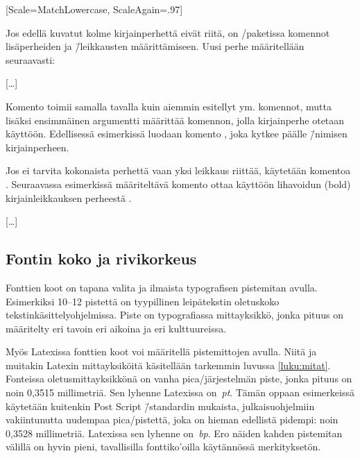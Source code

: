 \begin{koodilohkosis}
  \setmonofont{TeX Gyre Cursor}
  [Scale=MatchLowercase, ScaleAgain=.97]
\end{koodilohkosis}

\pagebreak[3]

Jos edellä kuvatut kolme kirjainperhettä eivät riitä, on
\-/paketissa komennot lisäperheiden ja \=/leikkausten
määrittämiseen. Uusi perhe määritellään seuraavasti:

\begin{koodilohkosis}
  […]
\end{koodilohkosis}

Komento  toimii samalla tavalla kuin
aiemmin esitellyt  ym. komennot, mutta
lisäksi ensimmäinen argumentti määrittää komennon, jolla kirjainperhe
otetaan käyttöön. Edellisessä esimerkissä luodaan komento , joka kytkee päälle 
\=/nimisen kirjainperheen.

\pagebreak[3]

Jos ei tarvita kokonaista perhettä vaan yksi leikkaus riittää, käytetään
komentoa . Seuraavassa esimerkissä
määriteltävä komento  ottaa käyttöön
lihavoidun (bold) kirjainleikkauksen perheestä .

\begin{koodilohkosis}
  […]
\end{koodilohkosis}

\subsection{Fontin koko ja rivikorkeus}

Fonttien koot on tapana valita ja ilmaista typografisen pistemitan
avulla. Esimerkiksi 10--12 pistettä on tyypillinen leipätekstin
oletuskoko teks\-tin\-kä\-sit\-tely\-ohjel\-mis\-sa. Piste on
typografiassa mitta\-yksikkö, jonka pituus on määritelty eri tavoin eri
aikoina ja eri kulttuureissa.

Myös Latexissa fonttien koot voi määritellä pistemittojen avulla. Niitä
ja muitakin Latexin mit\-ta\-yk\-si\-köi\-tä käsitellään tarkemmin
luvussa \ref{luku:mitat}. Fonteissa ole\-tus\-mitta\-yk\-sik\-kö\-nä on
vanha pica\-/järjestelmän piste, jonka pituus on noin 0,3515
millimetriä. Sen lyhenne Latexissa on~\emph{pt}. Tämän oppaan
esimerkeissä käytetään kuitenkin Post Script \=/standardin mukaista,
julkaisuohjelmiin vakiintunutta uudempaa pica\-/pistettä, joka on hieman
edellistä pidempi: noin 0,3528 millimetriä. Latexissa sen lyhenne
on~\emph{bp}. Ero näiden kahden pistemitan välillä on hyvin pieni,
tavallisilla fonttiko'oilla käytännössä merkityksetön.

